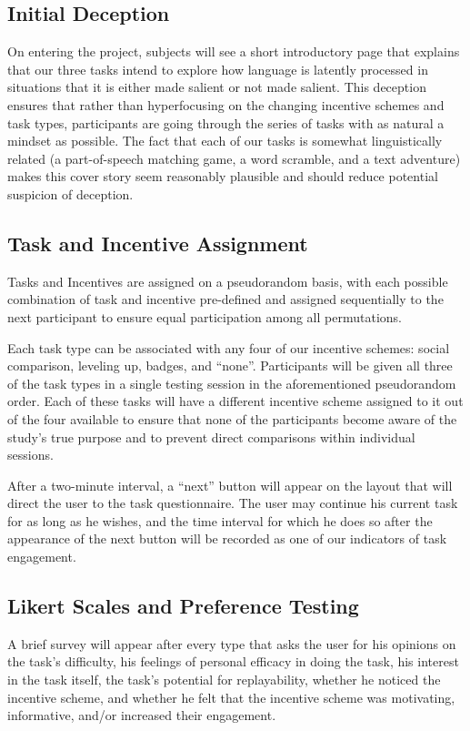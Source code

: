  \subsection{Initial Deception}
On entering the project, subjects will see a short introductory page that explains that our three tasks intend to explore how language is latently processed in situations that it is either made salient or not made salient. This deception ensures that rather than hyperfocusing on the changing incentive schemes and task types, participants are going through the series of tasks with as natural a mindset as possible. The fact that each of our tasks is somewhat linguistically related (a part-of-speech matching game, a word scramble, and a text adventure) makes this cover story seem reasonably plausible and should reduce potential suspicion of deception.
 
 \subsection{Task and Incentive Assignment}
Tasks and Incentives are assigned on a pseudorandom basis, with each possible combination of task and incentive pre-defined and assigned sequentially to the next participant to ensure equal participation among all permutations.

Each task type can be associated with any four of our incentive schemes: social comparison, leveling up, badges, and “none”. Participants will be given all three of the task types in a single testing session in the aforementioned pseudorandom order. Each of these tasks will have a different incentive scheme assigned to it out of the four available to ensure that none of the participants become aware of the study’s true purpose and to prevent direct comparisons within individual sessions.

After a two-minute interval, a “next” button will appear on the layout that will direct the user to the task questionnaire. The user may continue his current task for as long as he wishes, and the time interval for which he does so after the appearance of the next button will be recorded as one of our indicators of task engagement.  
 \subsection{Likert Scales and Preference Testing}

A brief survey will appear after every type that asks the user for his opinions on the task’s difficulty, his feelings of personal efficacy in doing the task, his interest in the task itself, the task’s potential for replayability, whether he noticed the incentive scheme, and whether he felt that the incentive scheme was motivating, informative, and/or increased their engagement. 

